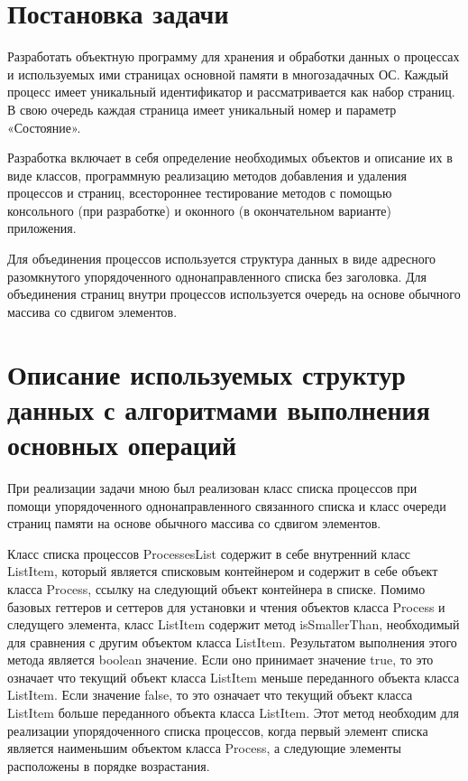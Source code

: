 \documentclass[russian,utf8,simple,hpadding=10mm,vpadding=20mm]{eskdtext}
\begin{document}
\maketitle
\newpage

\sloppy

\linespread{1,5}
\tableofcontents

\newpage
\parindent=15mm
\doublespacing
\section{Постановка задачи}

Разработать объектную программу для хранения и обработки данных о процессах и используемых ими страницах основной памяти в многозадачных ОС. Каждый процесс имеет уникальный идентификатор и рассматривается как набор страниц. В свою очередь каждая страница имеет уникальный номер и параметр «Состояние».

Разработка включает в себя определение необходимых объектов и описание их в виде классов, программную реализацию методов добавления и удаления процессов и страниц, всестороннее тестирование методов с помощью консольного (при разработке) и оконного (в окончательном варианте) приложения.

Для объединения процессов используется структура данных в виде адресного разомкнутого упорядоченного однонаправленного списка без заголовка. Для объединения страниц внутри процессов  используется очередь на основе обычного массива со сдвигом элементов.


\newpage
\parindent=15mm
\doublespacing
\section{Описание используемых структур данных с алгоритмами выполнения основных операций}

При реализации задачи мною был реализован класс списка процессов при помощи упорядоченного однонаправленного связанного списка и класс очереди страниц памяти на основе обычного массива со сдвигом элементов.

Класс списка процессов ProcessesList содержит в себе внутренний класс ListItem, который является списковым контейнером и содержит в себе объект класса Process, ссылку на следующий объект контейнера в списке. Помимо базовых геттеров и сеттеров для установки и чтения объектов класса Process и следущего элемента, класс ListItem содержит метод isSmallerThan, необходимый для сравнения с другим объектом класса ListItem. Результатом выполнения этого метода является boolean значение. Если оно принимает значение true, то это означает что текущий объект класса ListItem меньше переданного объекта класса ListItem. Если значение false, то это означает что текущий объект класса ListItem больше переданного объекта класса ListItem. Этот метод необходим для реализации упорядоченного списка процессов, когда первый элемент списка является наименьшим объектом класса Process, а следующие элементы расположены в порядке возрастания.
\end{document}

